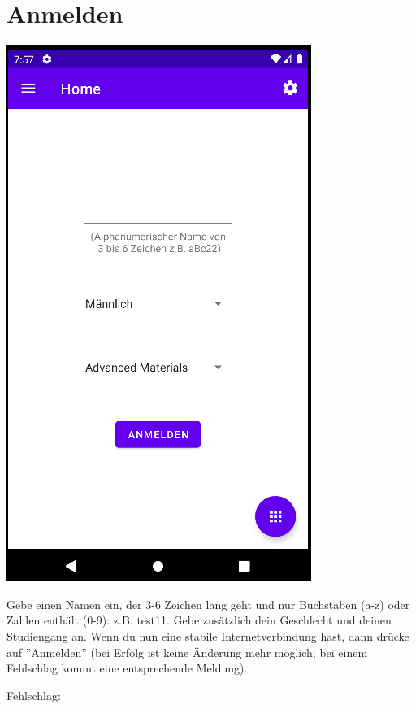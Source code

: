 \documentclass{article}
\begin{document}
\section{Anmelden}
\begin{center}
    \includegraphics[scale=0.5]{start_reg.png}
\end{center}
Gebe einen Namen ein, der 3-6 Zeichen lang geht und nur Buchstaben (a-z) oder Zahlen enthält (0-9): z.B. test11. Gebe zusätzlich dein Geschlecht und deinen Studiengang an. Wenn du nun eine stabile Internetverbindung hast, dann drücke auf ''Anmelden'' (bei Erfolg ist keine Änderung mehr möglich; bei einem Fehlschlag kommt eine entsprechende Meldung).
\newpage
\begin{center}
    Fehlschlag:
\end{center}
\end{document}

